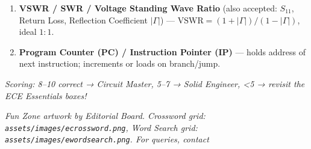 \begin{tcolorbox}[
  colback=black!2,
  colframe=IEEEblue!75!black,
  boxrule=0.6pt,
  arc=0mm,
  left=4mm, right=4mm, top=1.5mm, bottom=1.5mm
]
\begin{enumerate}[leftmargin=1.9em,itemsep=1pt,topsep=0pt,parsep=0pt]
  \item \textbf{VSWR / SWR / Voltage Standing Wave Ratio} (also accepted: $S_{11}$, Return Loss, Reflection Coefficient $|\Gamma|$) — $ \text{VSWR}=(1+|\Gamma|)/(1-|\Gamma|)$, ideal $1\!:\!1$.

  \item \textbf{Program Counter (PC) / Instruction Pointer (IP)} — holds address of next instruction; increments or loads on branch/jump.
\end{enumerate}

\smallskip
{\scriptsize\itshape Scoring: 8–10 correct → Circuit Master, 5–7 → Solid Engineer, <5 → revisit the ECE Essentials boxes!}
\end{tcolorbox}

\vfill
\begin{center}
{\scriptsize\itshape\color{black!55} Fun Zone artwork by Editorial Board. Crossword grid: \texttt{assets/images/ecrossword.png}, Word Search grid: \texttt{assets/images/ewordsearch.png}. For queries, contact  \par}
\end{center}
